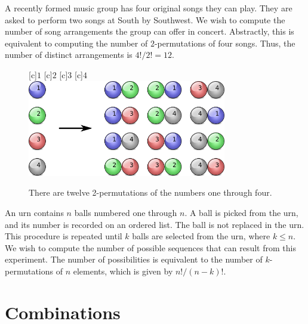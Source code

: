 \begin{example}
A recently formed music group has four original songs they can play.
They are asked to perform two songs at South by Southwest.
We wish to compute the number of song arrangements the group can offer in concert.
Abstractly, this is equivalent to computing the number of $2$-permutations of four songs.
Thus, the number of distinct arrangements is ${4!}/{2!} = 12$.
\end{example}

\begin{figure}[htb!]
\begin{center}
\begin{psfrags}
[c]{$1$}
[c]{$2$}
[c]{$3$}
[c]{$4$}
\includegraphics[height=4.215cm]{Figures/4Chapter/kpermutation}
\end{psfrags}
\caption{There are twelve 2-permutations of the numbers one through four.}
\label{figure:Kpermutation}
\end{center}
\end{figure}

\begin{example}
An urn contains $n$ balls numbered one through $n$.
A ball is picked from the urn, and its number is recorded on an ordered list.
The ball is not replaced in the urn.
This procedure is repeated until $k$ balls are selected from the urn, where $k \leq n$.
We wish to compute the number of possible sequences that can result from this experiment.
The number of possibilities is equivalent to the number of $k$-permutations of $n$ elements, which is given by $n! / (n-k)!$.
\end{example}


\section{Combinations}

